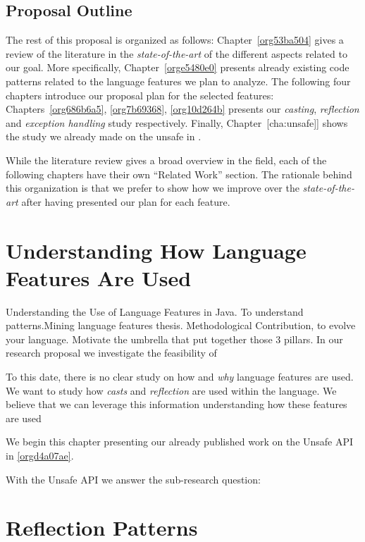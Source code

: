 \documentclass{usiinfdocprop}
\begin{document}
\section{Proposal Outline}
\label{sec:orge74ed00}
The rest of this proposal is organized as follows:
Chapter~\ref{org53ba504} gives a review of the literature in the \emph{state-of-the-art} of the different aspects related to our goal.
More specifically, Chapter~\ref{orge5480e0} presents already existing code patterns related to the language features we plan to analyze.
The following four chapters introduce our proposal plan for the selected features:
Chapters~\ref{org686b6a5}, \ref{org7b69368}, \ref{org10d264b} presents our \emph{casting}, \emph{reflection} and \emph{exception handling} study respectively.
Finally, Chapter~[cha:unsafe]] shows the study we already made on the unsafe \api{} in \java{}.

While the literature review gives a broad overview in the field, each of the following chapters have their own ``Related Work'' section. 
The rationale behind this organization is that we prefer to show how we improve over the \emph{state-of-the-art} after having presented our plan for each feature.

\chapter{Understanding How \java{} Language Features Are Used}
\label{sec:org6351c27}
Understanding the Use of Language Features in Java.
To understand patterns.Mining language features thesis.
Methodological Contribution, to evolve your language.
Motivate the umbrella that put together those 3 pillars.
In our research proposal we investigate the feasibility of

To this date, there is no clear study on how and \emph{why} language features are used.
We want to study how \emph{casts} and \emph{reflection} are used within the \java{} language.
We believe that we can leverage this information
understanding how these features are used

We begin this chapter presenting our already published work on the Unsafe API in \ref{orgd4a07ae}.

With the Unsafe API we answer the sub-research question:

\chapter{Reflection Patterns \label{org7b69368}}
\label{sec:org2457f5d}
\end{document}

